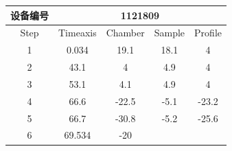 \documentclass[UTF8,10pt,a4paper,fontset=fandol]{ctexart}
\newcommand{\fieldvalue}[1]{#1}
\begin{document}
\small
\begin{tabularx}{0.55\textwidth}{|c|c|c|c|c|}
\hline
设备编号 & \multicolumn{4}{c|}{%
\fieldvalue{1121809}} \\
\hline
Step & Timeaxis & Chamber & Sample & Profile \\
\hline
\fieldvalue{1} &
\fieldvalue{0.034} &
\fieldvalue{19.1} &
\fieldvalue{18.1} &
\fieldvalue{4} \\
\hline
\fieldvalue{2} &
\fieldvalue{43.1} &
\fieldvalue{4} &
\fieldvalue{4.9} &
\fieldvalue{4} \\
\hline
\fieldvalue{3} &
\fieldvalue{53.1} &
\fieldvalue{4.1} &
\fieldvalue{4.9} &
\fieldvalue{4} \\
\hline
\fieldvalue{4} &
\fieldvalue{66.6} &
\fieldvalue{-22.5} &
\fieldvalue{-5.1} &
\fieldvalue{-23.2} \\
\hline
\fieldvalue{5} &
\fieldvalue{66.7} &
\fieldvalue{-30.8} &
\fieldvalue{-5.2} &
\fieldvalue{-25.6} \\
\hline
\fieldvalue{6} &
\fieldvalue{69.534} &
\fieldvalue{-20} &

\end{tabularx}
\end{document}
